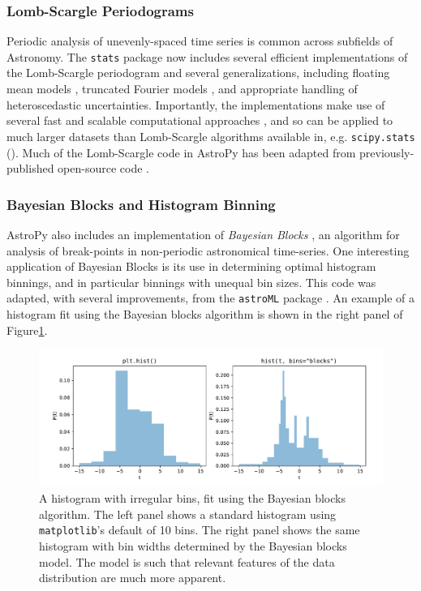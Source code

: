 \documentclass[modern]{aastex61}
\newcommand{\package}[1]{\texttt{#1}\xspace}
\renewcommand{\figurename}{Figure\xspace}
\begin{document}
\subsubsection{Lomb-Scargle Periodograms}
Periodic analysis of unevenly-spaced time series is common across subfields of Astronomy. The \package{stats} package now includes several efficient implementations of the Lomb-Scargle periodogram \citep{Lomb76, Scargle82} and several generalizations, including floating mean models \citep{Zechmeister09}, truncated Fourier models \citep{Bretthorst2003}, and appropriate handling of heteroscedastic uncertainties. Importantly, the implementations make use of several fast and scalable computational approaches \citep[e.g.][]{Press89, Palmer09}, and so can be applied to much larger datasets than Lomb-Scargle algorithms available in, e.g. \package{scipy.stats} (\citealt{scipy}). Much of the Lomb-Scargle code in AstroPy has been adapted from previously-published open-source code \citep{astroML, VanderPlas2015}.

\subsubsection{Bayesian Blocks and Histogram Binning}
AstroPy also includes an implementation of {\it Bayesian Blocks} \citep{Scargle2013}, an algorithm for analysis of break-points in non-periodic astronomical time-series. One interesting application of Bayesian Blocks is its use in determining optimal histogram binnings, and in particular binnings with unequal bin sizes. This code was adapted, with several improvements, from the \package{astroML} package \citep{astroML}. An example of a histogram fit using the Bayesian blocks algorithm is shown in the right panel of \figurename\ref{fig:bayes-blocks-hist}.

\begin{figure}
\includegraphics[width=\textwidth]{bayesian_blocks_hist.pdf}
\caption{%
    A histogram with irregular bins, fit using the Bayesian blocks
    algorithm. The left panel shows a standard histogram using
    \package{matplotlib}'s default of 10 bins. The right panel shows
    the same histogram with bin widths determined by the Bayesian
    blocks model. The model is such that relevant features of the data
    distribution are much more apparent.
    \label{fig:bayes-blocks-hist}
}
\end{figure}
\end{document}
